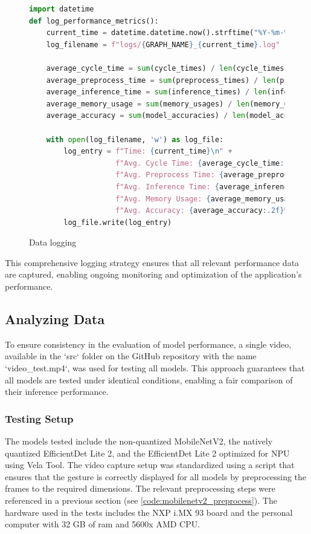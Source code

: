 \begin{figure}[H]
\begin{lstlisting}[language=Python]
import datetime
def log_performance_metrics():
    current_time = datetime.datetime.now().strftime("%Y-%m-%d_%H-%M-%S")
    log_filename = f"logs/{GRAPH_NAME}_{current_time}.log"

    average_cycle_time = sum(cycle_times) / len(cycle_times)
    average_preprocess_time = sum(preprocess_times) / len(preprocess_times)
    average_inference_time = sum(inference_times) / len(inference_times)
    average_memory_usage = sum(memory_usages) / len(memory_usages)
    average_accuracy = sum(model_accuracies) / len(model_accuracies)

    with open(log_filename, 'w') as log_file:
        log_entry = f"Time: {current_time}\n" +
                    f"Avg. Cycle Time: {average_cycle_time:.8f}s\n" +
                    f"Avg. Preprocess Time: {average_preprocess_time:.8f}s\n" +
                    f"Avg. Inference Time: {average_inference_time:.8f}s\n" +
                    f"Avg. Memory Usage: {average_memory_usage} MB\n" +
                    f"Avg. Accuracy: {average_accuracy:.2f}%\n"
        log_file.write(log_entry)
\end{lstlisting}
\caption{Data logging}
\label{code:inference_logging_example}
\end{figure}

This comprehensive logging strategy ensures that all relevant performance data are captured, enabling ongoing monitoring and optimization of the application's performance.

\subsection{Analyzing Data}
To ensure consistency in the evaluation of model performance, a single video, available in the `src` folder on the GitHub repository \cite{gajdosik2024gesture} with the name `video\_test.mp4`, was used for testing all models. This approach guarantees that all models are tested under identical conditions, enabling a fair comparison of their inference performance.

\subsubsection{Testing Setup}
The models tested include the non-quantized MobileNetV2, the natively quantized EfficientDet Lite 2, and the EfficientDet Lite 2 optimized for NPU using Vela Tool. The video capture setup was standardized using a script that ensures that the gesture is correctly displayed for all models by preprocessing the frames to the required dimensions. The relevant preprocessing steps were referenced in a previous section (see \ref{code:mobilenetv2_preprocess}). The hardware used in the tests includes the NXP i.MX 93 board \cite{iMX93FAMFS} and the personal computer with 32 GB of ram and 5600x AMD CPU.

